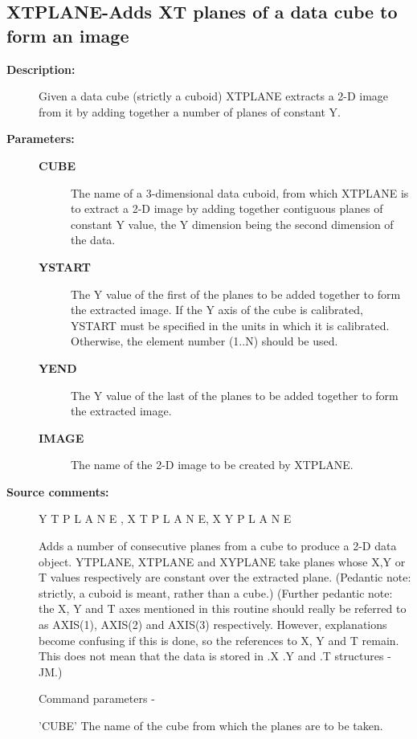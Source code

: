 \subsection{XTPLANE-\label{XTPLANE}Adds XT planes of a data cube to form an image}
\begin{description}

\item [\textbf{Description:}]
 Given a data cube (strictly a cuboid) XTPLANE extracts a 2-D image
 from it by adding together a number of planes of constant Y.

\item [\textbf{Parameters:}]
\begin{description}
\item [\textbf{CUBE}]
 The name of a 3-dimensional data cuboid,
 from which XTPLANE is to extract a 2-D image by adding
 together contiguous planes of constant Y value, the
 Y dimension being the second dimension of the data.
\item [\textbf{YSTART}]
 The Y value of the first of the planes to
 be added together to form the extracted image.  If
 the Y axis of the cube is calibrated, YSTART must be
 specified in the units in which it is calibrated.
 Otherwise, the element number (1..N) should be used.
\item [\textbf{YEND}]
 The Y value of the last of the planes to
 be added together to form the extracted image.
\item [\textbf{IMAGE}]
 The name of the 2-D image to be created by XTPLANE.
\end{description}

\item [\textbf{Source comments:}]
\begin{terminalv}
 Y T P L A N E ,   X T P L A N E,    X Y P L A N E

 Adds a number of consecutive planes from a cube to
 produce a 2-D data object.  YTPLANE, XTPLANE and XYPLANE
 take planes whose X,Y or T values respectively are
 constant over the extracted plane.  (Pedantic note:
 strictly, a cuboid is meant, rather than a cube.)
 (Further pedantic note: the X, Y and T axes
 mentioned in this routine should really be referred to
 as AXIS(1), AXIS(2) and AXIS(3) respectively. However,
 explanations become confusing if this is done, so the references to
 X, Y and T remain. This does not mean that the data is stored in
 .X .Y and .T structures - JM.)

 Command parameters -

 'CUBE'     The name of the cube from which the planes
            are to be taken.


\end{terminalv}
\end{description}
